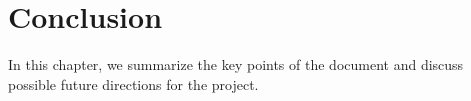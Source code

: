 \chapter{Conclusion}\label{ch:conclusion}

In this chapter, we summarize the key points of the document and discuss possible future directions for the project.
